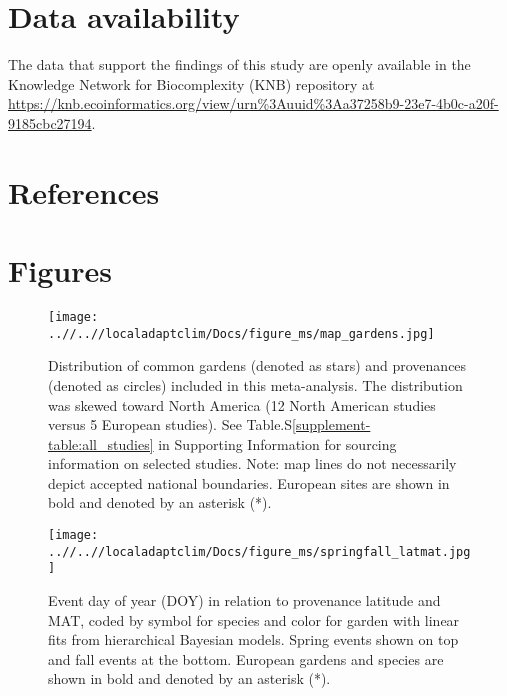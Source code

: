 \documentclass[12pt]{article}
\begin{document}
\section{Data availability}
The data that support the findings of this study are openly available in the Knowledge Network for Biocomplexity (KNB) repository at \url{https://knb.ecoinformatics.org/view/urn\%3Auuid\%3Aa37258b9-23e7-4b0c-a20f-9185cbc27194}.
 
\section{References} %




\clearpage
\section{Figures}
\begin{figure}[!h] 
    \centering
 \texttt{[image: ..//..//localadaptclim/Docs/figure\_ms/map\_gardens.jpg]}
    \caption{Distribution of common gardens (denoted as stars) and provenances (denoted as circles) included in this meta-analysis. The distribution was skewed toward North America (12 North American studies versus 5 European studies). See Table.S\ref{supplement-table:all_studies} in Supporting Information for sourcing information on selected studies. Note: map lines do not necessarily depict accepted national boundaries. European sites are shown in bold and denoted by an asterisk (*). }
    \label{figure:map_gardens}
\end{figure}


\begin{figure}[!h] 
    \centering
 \texttt{[image: ..//..//localadaptclim/Docs/figure\_ms/springfall\_latmat.jpg]}
    \caption{Event day of year (DOY) in relation to provenance latitude and MAT, coded by symbol for species and color for garden with linear fits from hierarchical Bayesian models. Spring events shown on top and fall events at the bottom. European gardens and species are shown in bold and denoted by an asterisk (*). } 
    \label{figure:springfall_latmat}
\end{figure}
\end{document}
